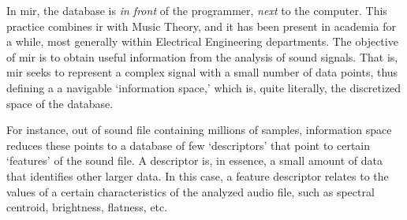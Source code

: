 
In \gls{mir}, the database is \textit{in front} of the programmer, \textit{next} to the computer. This practice combines \gls{ir} with Music Theory, and it has been present in academia for a while, most generally within Electrical Engineering departments. The objective of \gls{mir} is to obtain useful information from the analysis of sound signals. That is, \gls{mir} seeks to represent a complex signal with a small number of data points, thus defining a a navigable `information space,' which is, quite literally, the discretized space of the database.


For instance, out of sound file containing millions of samples, information space reduces these points to a database of few `descriptors' that point to certain `features' of the sound file. A descriptor is, in essence, a small amount of data that identifies other larger data. In this case, a feature descriptor relates to the values of a certain characteristics of the analyzed audio file, such as spectral centroid, brightness, flatness, etc. 

